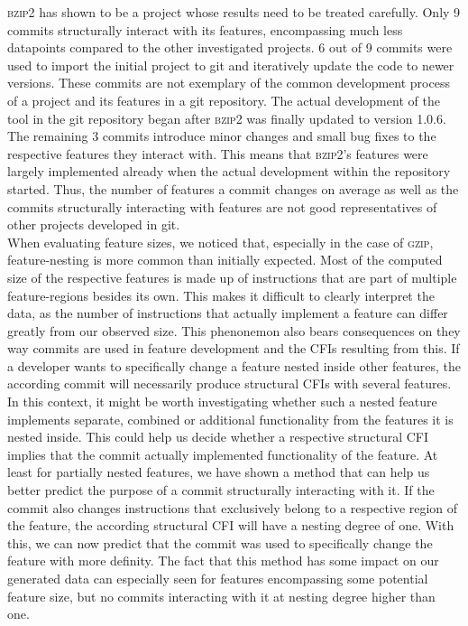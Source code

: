 \textsc{bzip2} has shown to be a project whose results need to be treated carefully.
Only 9 commits structurally interact with its features, encompassing much less datapoints compared to the other investigated projects.
6 out of 9 commits were used to import the initial project to git and iteratively update the code to newer versions.
These commits are not exemplary of the common development process of a project and its features in a git repository.
The actual development of the tool in the git repository began after \textsc{bzip2} was finally updated to version 1.0.6.
The remaining 3 commits introduce minor changes and small bug fixes to the respective features they interact with.
This means that \textsc{bzip2}'s features were largely implemented already when the actual development within the repository started.
Thus, the number of features a commit changes on average as well as the commits structurally interacting with features are not good representatives of other projects developed in git. \\
When evaluating feature sizes, we noticed that, especially in the case of \textsc{gzip}, feature-nesting is more common than initially expected.
Most of the computed size of the respective features is made up of instructions that are part of multiple feature-regions besides its own.
This makes it difficult to clearly interpret the data, as the number of instructions that actually implement a feature can differ greatly from our observed size.
This phenonemon also bears consequences on they way commits are used in feature development and the CFIs resulting from this.
If a developer wants to specifically change a feature nested inside other features, the according commit will necessarily produce structural CFIs with several features.
In this context, it might be worth investigating whether such a nested feature implements separate, combined or additional functionality from the features it is nested inside.
This could help us decide whether a respective structural CFI implies that the commit actually implemented functionality of the feature.
At least for partially nested features, we have shown a method that can help us better predict the purpose of a commit structurally interacting with it.
If the commit also changes instructions that exclusively belong to a respective region of the feature, the according structural CFI will have a nesting degree of one.
With this, we can now predict that the commit was used to specifically change the feature with more definity.
The fact that this method has some impact on our generated data can especially seen for features encompassing some potential feature size, but no commits interacting with it at nesting degree higher than one.\\

